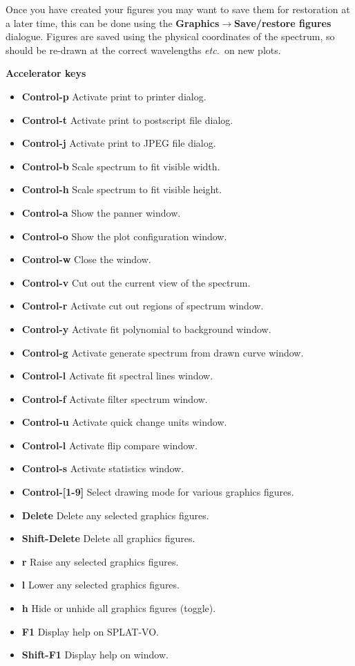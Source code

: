 \documentclass[twoside,11pt]{article}
\newcommand{\latexhtml}[2]{#1}
\renewcommand{\_}{\texttt{\symbol{95}}}
\newcommand{\SPLAT}{\textsf{SPLAT-VO}}
\newcommand{\submenuitem}[2]{\latexhtml{\textbf{#1$\rightarrow$#2}}{\textbf{#1->#2}}}
\newcommand{\labelitem}[1]{\textbf{#1}}
\newcommand{\etc}{\textit{etc.}}
\newcommand{\subheading}[1]{\textbf{\large{#1}}}
\begin{document}
Once you have created your figures you may want to save them for restoration
at a later time, this can be done using the
\submenuitem{Graphics}{Save/restore figures} dialogue. Figures are saved using
the physical coordinates of the spectrum, so should be re-drawn at the correct
wavelengths \etc\ on new plots.

\subheading{Accelerator keys}

\begin{itemize}
\item \labelitem{Control-p} Activate print to printer dialog.
\item \labelitem{Control-t} Activate print to postscript file dialog.
\item \labelitem{Control-j} Activate print to JPEG file dialog.
\item \labelitem{Control-b} Scale spectrum to fit visible width.
\item \labelitem{Control-h} Scale spectrum to fit visible height.
\item \labelitem{Control-a} Show the panner window.
\item \labelitem{Control-o} Show the plot configuration window.
\item \labelitem{Control-w} Close the window.
\item \labelitem{Control-v} Cut out the current view of the spectrum.
\item \labelitem{Control-r} Activate cut out regions of spectrum window.
\item \labelitem{Control-y} Activate fit polynomial to background window.
\item \labelitem{Control-g} Activate generate spectrum from drawn curve window.
\item \labelitem{Control-l} Activate fit spectral lines window.
\item \labelitem{Control-f} Activate filter spectrum window.
\item \labelitem{Control-u} Activate quick change units window.
\item \labelitem{Control-l} Activate flip compare window.
\item \labelitem{Control-s} Activate statistics window.
\item \labelitem{Control-[1-9]} Select drawing mode for various graphics figures.
\item \labelitem{Delete} Delete any selected graphics figures.
\item \labelitem{Shift-Delete} Delete all graphics figures.
\item \labelitem{r} Raise any selected graphics figures.
\item \labelitem{l} Lower any selected graphics figures.
\item \labelitem{h} Hide or unhide all graphics figures (toggle).
\item \labelitem{F1} Display help on \SPLAT.     
\item \labelitem{Shift-F1} Display help on window.
\end{itemize}
\end{document}
